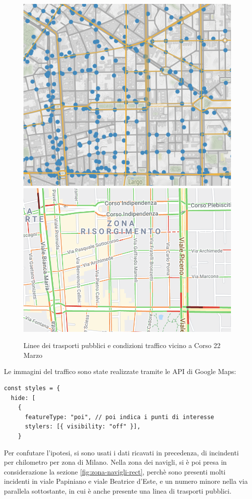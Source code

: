 \documentclass[a4paper]{report}
\begin{document}
\begin{figure}
    \includegraphics[width=0.45\linewidth]{../src/atm/22_marzo.png}
    \includegraphics[width=0.55\linewidth]{../src/codice_per_dati/googleMaps/22_marzo.png}
    \caption{Linee dei trasporti pubblici e condizioni traffico vicino a Corso 22 Marzo}
    \label{fig:22-marzo}
\end{figure}

Le immagini del traffico sono state realizzate tramite le API di Google Maps:  

\begin{lstlisting}
const styles = {
  hide: [
    {
      featureType: "poi", // poi indica i punti di interesse
      stylers: [{ visibility: "off" }],
    }
\end{lstlisting}

Per confutare l'ipotesi, si sono usati i dati ricavati in precedenza, 
di incindenti per chilometro per zona di Milano. 
Nella zona dei navigli, si è poi presa in considerazione la sezione \ref{fig:zona-navigli-rect}, 
perchè sono presenti molti incidenti in viale Papiniano e viale Beatrice d'Este, 
e un numero minore nella via parallela sottostante, in cui è anche presente 
una linea di trasporti pubblici.

\end{document}
